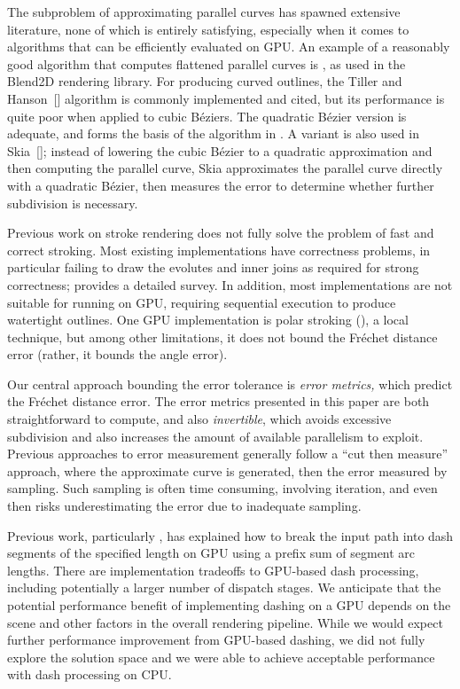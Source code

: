 \documentclass[sigconf, nonacm]{acmart}
\begin{document}
The subproblem of approximating parallel curves has spawned extensive literature, none of which is entirely satisfying, especially when it comes to algorithms that can be efficiently evaluated on GPU. An example of a reasonably good algorithm that computes flattened parallel curves is \citet{Yzerman2020}, as used in the Blend2D rendering library. For producing curved outlines, the Tiller and Hanson~[] algorithm is commonly implemented and cited, but its performance is quite poor when applied to cubic Béziers. The quadratic Bézier version is adequate, and forms the basis of the algorithm in \citet{Nehab2020}. A variant is also used in Skia~[]; instead of lowering the cubic Bézier to a quadratic approximation and then computing the parallel curve, Skia approximates the parallel curve directly with a quadratic Bézier, then measures the error to determine whether further subdivision is necessary.

Previous work on stroke rendering does not fully solve the problem of fast and correct stroking. Most existing implementations have correctness problems, in particular failing to draw the evolutes and inner joins as required for strong correctness; \citet{Nehab2020} provides a detailed survey. In addition, most implementations are not suitable for running on GPU, requiring sequential execution to produce watertight outlines. One GPU implementation is polar stroking (\citet{Kilgard2020}), a local technique, but among other limitations, it does not bound the Fréchet distance error (rather, it bounds the angle error).

Our central approach bounding the error tolerance is \emph{error metrics,} which predict the Fréchet distance error. The error metrics presented in this paper are both straightforward to compute, and also \emph{invertible}, which avoids excessive subdivision and also increases the amount of available parallelism to exploit. Previous approaches to error measurement generally follow a ``cut then measure'' approach, where the approximate curve is generated, then the error measured by sampling. Such sampling is often time consuming, involving iteration, and even then risks underestimating the error due to inadequate sampling.

Previous work, particularly \citet{Kilgard2020}, has explained how to break the input path into dash segments of the specified length on GPU using a prefix sum of segment arc lengths. There are implementation tradeoffs to GPU-based dash processing, including potentially a larger number of dispatch stages. We anticipate that the potential performance benefit of implementing dashing on a GPU depends on the scene and other factors in the overall rendering pipeline. While we would expect further performance improvement from GPU-based dashing, we did not fully explore the solution space and we were able to achieve acceptable performance with dash processing on CPU.
\end{document}

